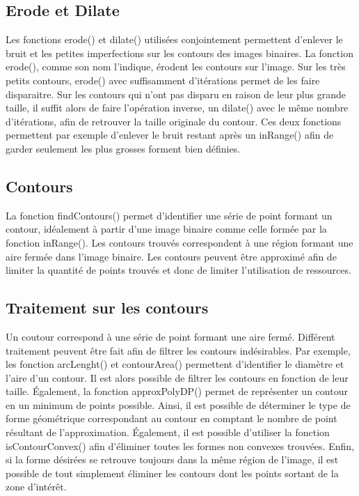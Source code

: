 \subsection{Erode et Dilate}

Les fonctions erode() et dilate() utilisées conjointement permettent d'enlever le bruit et les petites imperfections sur les contours des images binaires. La fonction erode(), comme son nom l'indique, érodent les contours sur l'image. Sur les très petits contours, erode() avec suffisamment d'itérations permet de les faire disparaitre. Sur les contours qui n'ont pas disparu en raison de leur plus grande taille, il suffit alors de faire l'opération inverse, un dilate() avec le même nombre d'itérations, afin de retrouver la taille originale du contour. Ces deux fonctions permettent par exemple d'enlever le bruit restant après un inRange() afin de garder seulement les plus grosses forment bien définies.

\subsection{Contours}

La fonction findContours() permet d'identifier une série de point formant un contour, idéalement à partir d'une image binaire comme celle formée par la fonction inRange(). Les contours trouvés correspondent à une région formant une aire fermée dans l'image binaire. Les contours peuvent être approximé afin de limiter la quantité de points trouvés et donc de limiter l'utilisation de ressources.

\subsection{Traitement sur les contours}

Un coutour correspond à une série de point formant une aire fermé. Différent traitement peuvent être fait afin de filtrer les contours indésirables. Par exemple, les fonction arcLenght() et contourArea() permettent d'identifier le diamètre et l'aire d'un contour. Il est alors possible de filtrer les contours en fonction de leur taille. Également, la fonction approxPolyDP() permet de représenter un contour en un minimum de points possible. Ainsi, il est possible de déterminer le type de forme géométrique correspondant au contour en comptant le nombre de point résultant de l'approximation. Également, il est possible d'utiliser la fonction isContourConvex() afin d'éliminer toutes les formes non convexes trouvées. Enfin, si la forme désirées se retrouve toujours dans la même région de l'image, il est possible de tout simplement éliminer les contours dont les points sortant de la zone d'intérêt.

